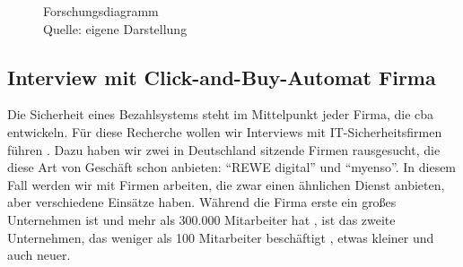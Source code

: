\begin{figure}[H]
  \caption{Forschungsdiagramm
  \\ Quelle: eigene Darstellung}
  \label{fig:FD}
\end{figure}

%






\subsection{Interview mit Click-and-Buy-Automat Firma}

Die Sicherheit eines Bezahlsystems steht im Mittelpunkt jeder Firma, die \acrfull{cba} entwickeln. Für diese Recherche 
wollen wir Interviews mit IT-Sicherheitsfirmen führen \cite{refbook:FWDL}. Dazu haben wir zwei in Deutschland sitzende
Firmen rausgesucht, die diese Art von Geschäft schon anbieten: ``REWE digital'' und ``myenso''. In diesem Fall werden wir
mit Firmen arbeiten, die zwar einen ähnlichen Dienst anbieten, aber verschiedene Einsätze haben. Während die Firma erste 
ein großes Unternehmen ist und mehr als 300.000 Mitarbeiter hat \cite{refst:REWE}, ist das zweite Unternehmen, das weniger
als 100 Mitarbeiter beschäftigt \cite{refst:MYENSO}, etwas kleiner und auch neuer.


